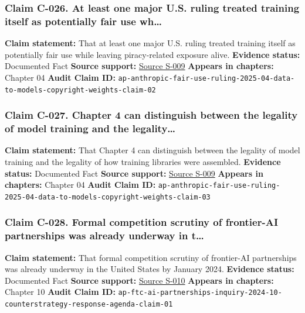 \documentclass[
  american,
  11pt,
  letterpaper,
]{article}
\begin{document}
\subsubsection{Claim C-026. At least one major U.S. ruling treated
training itself as potentially fair use
wh\ldots{}}\label{claim-c-026-at-least-one-major-u-s-ruling-treated-training-itself-as-potentially-fair-use-wh}

\textbf{Claim statement:} That at least one major U.S. ruling treated
training itself as potentially fair use while leaving piracy-related
exposure alive. \textbf{Evidence status:} Documented Fact \textbf{Source
support:}
\hyperref[source-s-009-anthropic-wins-ruling-on-ai-training-in-copyright-lawsuit-but-must-face-trial-on-pirated-books]{Source
S-009} \textbf{Appears in chapters:} Chapter 04 \textbf{Audit Claim ID:}
\texttt{ap-anthropic-fair-use-ruling-2025-04-data-to-models-copyright-weights-claim-02}

\subsubsection{Claim C-027. Chapter 4 can distinguish between the
legality of model training and the
legality\ldots{}}\label{claim-c-027-chapter-4-can-distinguish-between-the-legality-of-model-training-and-the-legality}

\textbf{Claim statement:} That Chapter 4 can distinguish between the
legality of model training and the legality of how training libraries
were assembled. \textbf{Evidence status:} Documented Fact \textbf{Source
support:}
\hyperref[source-s-009-anthropic-wins-ruling-on-ai-training-in-copyright-lawsuit-but-must-face-trial-on-pirated-books]{Source
S-009} \textbf{Appears in chapters:} Chapter 04 \textbf{Audit Claim ID:}
\texttt{ap-anthropic-fair-use-ruling-2025-04-data-to-models-copyright-weights-claim-03}

\subsubsection{Claim C-028. Formal competition scrutiny of frontier-AI
partnerships was already underway in
t\ldots{}}\label{claim-c-028-formal-competition-scrutiny-of-frontier-ai-partnerships-was-already-underway-in-t}

\textbf{Claim statement:} That formal competition scrutiny of
frontier-AI partnerships was already underway in the United States by
January 2024. \textbf{Evidence status:} Documented Fact \textbf{Source
support:}
\hyperref[source-s-010-ftc-opens-inquiry-into-big-tech-s-partnerships-with-leading-ai-startups]{Source
S-010} \textbf{Appears in chapters:} Chapter 10 \textbf{Audit Claim ID:}
\texttt{ap-ftc-ai-partnerships-inquiry-2024-10-counterstrategy-response-agenda-claim-01}
\end{document}
